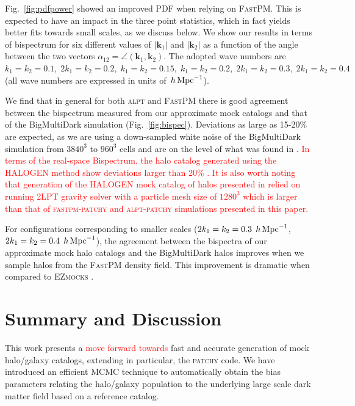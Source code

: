 \documentclass[english,usenatbib]{mn2e}
\newcommand{\tod}[1]{{\textcolor{red}{ #1}}}
\newcommand{\hperm}{\,h\,{\rm Mpc}^{-1}}
\begin{document}
Fig.~\ref{fig:pdfpower} showed an improved PDF when relying on \textsc{FastPM}. This is expected to have an impact in the three point statistics, which in fact yields better fits towards small scales, as we discuss below. 
We show our results in terms of bispectrum for six different values of $|\mathbf{k}_1|$ and $|\mathbf{k}_2|$ as a function of the angle between the two vectors $\alpha_{12} = \angle (\mathbf{k}_1 , \mathbf{k}_2)$. The adopted wave numbers are $k_1=k_2=0.1,\; 2k_1=k_2=0.2,\; k_1=k_2=0.15,\; k_1=k_2=0.2,\; 2k_1=k_2=0.3,\; 2k_1=k_2=0.4$ (all wave numbers are expressed in units of $\hperm$). 

We find that in general for both \textsc{alpt} and \textsc{FastPM} there is good agreement between the bispectrum measured from our approximate mock catalogs and that of the BigMultiDark simulation (Fig.~\ref{fig:bispec}). 
Deviations as large as 15-20\% are expected, as we are using a down-sampled  white noise of the BigMultiDark simulation from $3840^3$ to $960^3$ cells and are on the level of what was found in \citet[][]{kitaura2015}. \tod{In terms of the real-space Bispectrum, the halo catalog generated using the \textsc{HALOGEN} method show deviations larger than 20\% \citep[see real-space lines in the lower panels in Fig.~13 of][]{chuang2015}. It is also worth noting that generation of the \textsc{HALOGEN} mock catalog of halos presented in \citet{chuang2015} relied on running 2LPT gravity solver with a particle mesh size of $1280^3$ which is larger than that of \textsc{fastpm-patchy} and \textsc{alpt-patchy} simulations presented in this paper.}

For configurations corresponding to smaller scales ($2k_1=k_2=0.3\;\hperm$, $2k_1=k_2=0.4\;\hperm$), the agreement between the bispectra of our approximate mock halo catalogs and the BigMultiDark halos improves when we sample halos from the \textsc{FastPM} density field. This improvement is dramatic when compared to \textsc{EZmocks} \citep[see real-space lines in the lower panels in Fig.~5 of][]{eazymock}. 

\section{Summary and Discussion}
\label{sec:discussion}


This work presents a \tod{move forward towards} fast and accurate generation of mock halo/galaxy catalogs, extending in particular, the \textsc{patchy} code. We have introduced an efficient MCMC technique to automatically obtain the bias parameters relating the halo/galaxy population to the underlying large scale dark matter field based on a reference catalog. 
\end{document}

